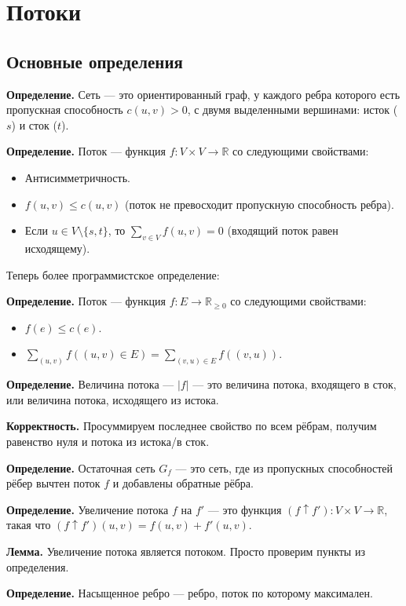 \section{Потоки}
\subsection{Основные определения}
\textbf{Определение.} Сеть --- это ориентированный граф, у каждого ребра которого есть пропускная способность $c(u, v) > 0$, с двумя выделенными вершинами: исток ($s$) и сток ($t$).

\textbf{Определение.} Поток --- функция $f: V \times V \to \mathbb R$ со следующими свойствами:
\begin{itemize}
    \item Антисимметричность.
    \item $f(u, v) \le c(u, v)$ (поток не превосходит пропускную способность ребра).
    \item Если $u \in V \setminus \{s, t\}$, то $\sum_{v \in V} f(u, v) = 0$ (входящий поток равен исходящему).
\end{itemize}

Теперь более программистское определение:

\textbf{Определение.} Поток --- функция $f: E \to \mathbb R_{\ge 0}$ со следующими свойствами:
\begin{itemize}
    \item $f(e) \le c(e)$.
    \item $\sum_{(u, v)} f((u, v) \in E) = \sum_{(v, u) \in E} f((v, u))$.
\end{itemize}

\textbf{Определение.} Величина потока --- $|f|$ --- это величина потока, входящего в сток, или величина потока, исходящего из истока.

\textbf{Корректность.} Просуммируем последнее свойство по всем рёбрам, получим равенство нуля и потока из истока/в сток.

\textbf{Определение.} Остаточная сеть $G_f$ --- это сеть, где из пропускных способностей рёбер вычтен поток $f$ и добавлены обратные рёбра.

\textbf{Определение.} Увеличение потока $f$ на $f'$ --- это функция $(f \uparrow f'): V \times V \to \mathbb R$, такая что $(f \uparrow f')(u, v) = f(u, v) + f'(u, v)$.

\textbf{Лемма.} Увеличение потока является потоком. Просто проверим пункты из определения.

\textbf{Определение.} Насыщенное ребро --- ребро, поток по которому максимален.

